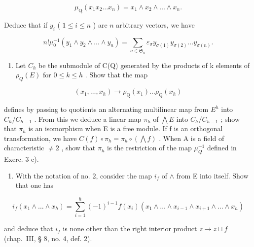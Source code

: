 \[
\mu_ {\mathrm{Q}} (x _ {1} x _ {2} \dots x _ {n}) = x _ {1} \wedge x _ {2} \wedge \dots \wedge x _ {n}.
\]

Deduce that if \(y_{i}\) ( \(1 \leqslant i \leqslant n\) ) are \(n\) arbitrary vectors, we have

\[
n! \mu_ {0} ^ {- 1} (y _ {1} \wedge y _ {2} \wedge \dots \wedge y _ {n}) = \sum_ {\sigma \in \mathfrak {S} _ {n}} \varepsilon_ {\sigma} y _ {\sigma (1)} y _ {\sigma (2)} \dots y _ {\sigma (n)}.
\]

\begin{enumerate}
\def\labelenumi{\arabic{enumi})}
\setcounter{enumi}{3}
\tightlist
\item
  Let \(C_{h}\) be the submodule of C(Q) generated by the products of k elements of \(\rho_{Q}(E)\) for \(0 \leqslant k \leqslant h\) . Show that the map
\end{enumerate}

\[
(x _ {1}, \dots , x _ {h}) \rightarrow \rho_ {\mathrm{Q}} (x _ {1}) \dots \rho_ {\mathrm{Q}} (x _ {h})
\]

defines by passing to quotients an alternating multilinear map from \(E^{h}\) into \(C_{h}/C_{h-1}\) . From this we deduce a linear map \(\pi_{h}\) of \(\bigwedge E\) into \(C_{h}/C_{h-1}\) ; show that \(\pi_{h}\) is an isomorphism when E is a free module. If f is an orthogonal transformation, we have \(C(f)\circ\pi_{h}=\pi_{h}\circ(\bigwedge f)\) . When A is a field of characteristic \(\neq2\) , show that \(\pi_{h}\) is the restriction of the map \(\mu_{Q}^{-1}\) defined in Exerc. 3 c).

\begin{enumerate}
\def\labelenumi{\arabic{enumi})}
\setcounter{enumi}{4}
\tightlist
\item
  With the notation of no. 2, consider the map \(i_{f}\) of \(\wedge\) from E into itself. Show that one has
\end{enumerate}

\[
i _ {f} \left(x _ {1} \wedge \dots \wedge x _ {h}\right) = \sum_ {i = 1} ^ {h} (- 1) ^ {i - 1} f \left(x _ {i}\right) \left(x _ {1} \wedge \dots \wedge x _ {i - 1} \wedge x _ {i + 1} \wedge \dots \wedge x _ {h}\right)
\]

and deduce that \(i_{f}\) is none other than the right interior product \(z \to z \sqcup f\) (chap.~III, § 8, no. 4, def. 2).


